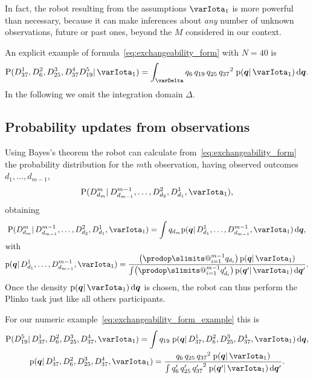 \documentclass[\ifafour a4paper,12pt,\else a5paper,10pt,\fi%
onecolumn,oneside,article,%
british%
]{memoir}
\makeatletter
\theoremstyle{remark}
\theoremstyle{innote}
\def\prod{\DOTSI\prodop\slimits@}
\newcommand*{\di}{\mathrm{d}}%
\newcommand*{\pf}{\mathrm{p}}%
\newcommand*{\p}{\mathrm{P}}%
\renewcommand*{\|}{\mathpunct{|}}
\newcommand*{\simpl}{\varDelta}
\newcommand*{\yqq}{q}
\newcommand*{\yq}{\bm{\yqq}}
\newcommand*{\yI}{\varIota}
\newcommand*{\yMJ}{\yI_1}
\makeatother
\begin{document}
In fact, the robot resulting from the assumptions $\yMJ$ is more powerful
than necessary, because it can make inferences about \emph{any} number of
unknown observations, future or past ones, beyond the $M$ considered in our
context.

An explicit example of formula~\eqref{eq:exchangeability_form} with $N=40$ is
\begin{equation}
  \label{eq:exchangeability_form_example}
  \p(D^1_{37} , D^2_{6} , D^3_{25}, D^4_{37} D^5_{19}\| \yMJ) =
  \int_\simpl \yqq_{6}\,\yqq_{19}\, \yqq_{25} \, {\yqq_{37}}^2\;
  \pf(\yq \| \yMJ)\,\di\yq.
\end{equation}
In the following we omit the integration domain $\simpl$.

\subsection{Probability updates from observations}
\label{sec:update_first_robot}

Using Bayes's theorem the robot can calculate
from~\eqref{eq:exchangeability_form} the probability distribution for the
$m$th observation, having observed outcomes $d_1,\dotsc,d_{m-1}$,
\begin{equation}
  \label{eq:general_prediction}
  \p(D^{m}_{d_{m}} \|
  D^{m-1}_{d_{m-1}}, \dotsc,  D^2_{d_2}, D^1_{d_1},  \yMJ),
\end{equation}
obtaining
\begin{subequations}\label{eq:prediction_exchangeability}
  \begin{gather}
    \p(D^{m}_{d_{m}}\| D^{m-1}_{d_{m-1}}, \dotsc,  D^2_{d_2}, D^1_{d_1}, \yMJ)
    = \int \yqq_{d_{m}} \pf(\yq \| D^1_{d_1}, \dotsc, D^{m-1}_{d_{m-1}}, \yMJ)\,\di\yq,
    \\
    \shortintertext{with}
    \pf(\yq \| D^1_{d_1}, \dotsc, D^{m-1}_{d_{m-1}}, \yMJ)
    = \frac{ \bigl( \prod_{i=1}^{m-1} \yqq_{d_i} \bigr)\, \pf(\yq \| \yMJ)
      }{
      \int  \bigl( \prod_{i=1}^{m-1} \yqq_{d_i}' \bigr)\, \pf(\yq' \| \yMJ)\,\di\yq'
      }.
\label{eq:exchang_updated_prior}
  \end{gather}
\end{subequations}
Once the density $\pf(\yq \| \yMJ)\,\di\yq$ is chosen, the robot can thus perform
the Plinko task just like all others participants.

For our numeric example~\eqref{eq:exchangeability_form_example} this is
\begin{subequations}\label{eq:prediction_exchangeability_example}
  \begin{gather}
    \p(D^5_{19} \| D^1_{37} , D^2_{6} , D^3_{25}, D^4_{37}, \yMJ)
    = \int \yqq_{19}\; \pf(\yq \|  D^1_{37} , D^2_{6} , D^3_{25}, D^4_{37}, \yMJ)\,\di\yq,
    \\
    \pf(\yq \|  D^1_{37} , D^2_{6} , D^3_{25}, D^4_{37}, \yMJ)
    = \frac{ \yqq_{6}\, \yqq_{25} \, {\yqq_{37}}^2\; \pf(\yq \| \yMJ)
    }{
      \int \yqq_{6}'\, \yqq_{25}' \, {\yqq_{37}'}^2\; \pf(\yq' \| \yMJ)\,\di\yq'
    }.
  \end{gather}
\end{subequations}
\end{document}
